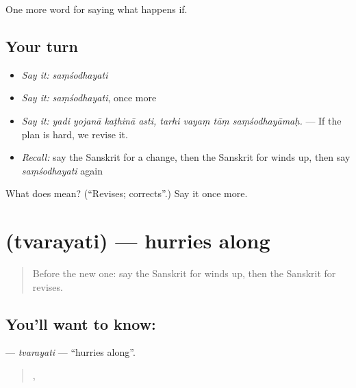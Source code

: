 \begin{grammarlens}[title={What you've built}]
One more word for saying what happens if.
\end{grammarlens}

\subsection*{Your turn}
\begin{itemize}
\raggedright
  \item \emph{Say it:} \emph{saṃśodhayati}
  \item \emph{Say it:} \emph{saṃśodhayati}, once more
  \item \emph{Say it:} \emph{yadi yojanā kaṭhinā asti, tarhi vayaṃ tāṃ saṃśodhayāmaḥ.} — If the plan is hard, we revise it.
  \item \emph{Recall:} say the Sanskrit for a change, then the Sanskrit for winds up, then say \emph{saṃśodhayati} again
\end{itemize}

\begin{tcolorbox}[breakable,colback=teal!4,colframe=teal!35!black,title={Before you move on}]
What does  mean? (\textquotedblleft{}Revises; corrects\textquotedblright{}.) Say it once more.
\end{tcolorbox}
\section[\texorpdfstring{\sk{त्वरयति} (tvarayati)}{त्वरयति (tvarayati)}]{ (tvarayati) — hurries along}

\label{lesson:SA-C529-tvarayati}



\begin{quote}
Before the new one: say the Sanskrit for winds up, then the Sanskrit for revises.
\end{quote}

\subsection*{You'll want to know: }
\textbf{} — \emph{tvarayati} — \textquotedblleft{}hurries along\textquotedblright{}.

\begin{quote}
   ,    
\end{quote}

